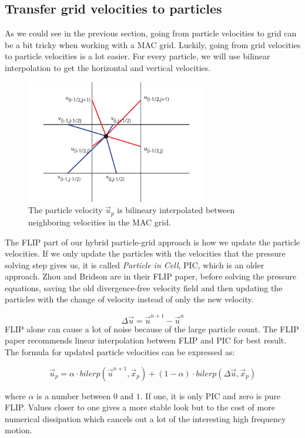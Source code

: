 \subsection{Transfer grid velocities to particles}

As we could see in the previous section, going from particle velocities to grid can be a bit tricky when working with a MAC grid. Luckily, going from grid velocities to particle velocities is a lot easier. For every particle, we will use bilinear interpolation to get the horizontal and vertical velocities.

\begin{figure}[ht!]
\centering
\includegraphics[width=80mm]{img/splat.pdf}
\caption{The particle velocity $\vec{u}_p$ is bilineary interpolated between neighboring velocities in the MAC grid.}
\label{onedge}
\end{figure}
\noindent
The FLIP part of our hybrid particle-grid approach is how we update the particle velocities. If we only update the particles with the velocities that the pressure solving step gives us, it is called \emph{Particle in Cell}, PIC, which is an older approach. Zhou and Bridson \cite{chu} are in their FLIP paper, before solving the pressure equations, saving the old divergence-free velocity field and then updating the particles with the change of velocity instead of only the new velocity.

\begin{equation}
\Delta \vec{u} = \vec{u}^{n+1} - \vec{u}^n
\end{equation}
\noindent
FLIP alone can cause a lot of noise because of the large particle count. The FLIP paper recommends linear interpolation between FLIP and PIC for best result. The formula for updated particle velocities can be expressed as:

\begin{equation}
\vec{u}_p = \alpha \cdot bilerp(\vec{u}^{n+1}, \vec{x}_p) + (1-\alpha) \cdot bilerp(\Delta \vec{u},\vec{x}_p)
\label{flipeq}
\end{equation}

where $\alpha$ is a number between $0$ and $1$. If one, it is only PIC and zero is pure FLIP. Values closer to one gives a more stable look but to the cost of more numerical dissipation which cancels out a lot of the interesting high frequency motion.
